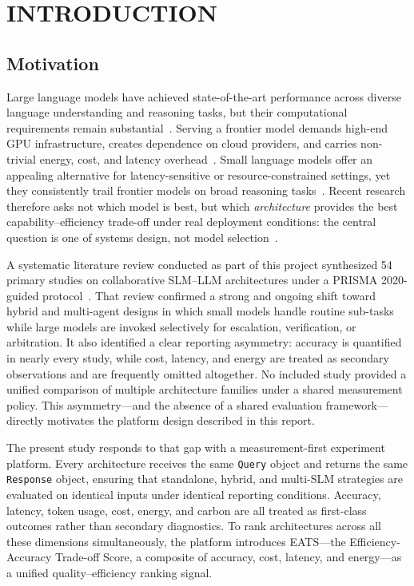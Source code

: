 \chapter{INTRODUCTION}

\section{Motivation}

Large language models have achieved state-of-the-art performance across diverse language understanding and reasoning tasks, but their computational requirements remain substantial~\cite{egi2025,wang2024slmsurvey,chen2025collabmech}. Serving a frontier model demands high-end GPU infrastructure, creates dependence on cloud providers, and carries non-trivial energy, cost, and latency overhead~\cite{energytoken2025,qwqrouting2025,tigani2025cpu}. Small language models offer an appealing alternative for latency-sensitive or resource-constrained settings, yet they consistently trail frontier models on broad reasoning tasks~\cite{egi2025,dorfner2024comparing}. Recent research therefore asks not which model is best, but which \emph{architecture} provides the best capability--efficiency trade-off under real deployment conditions: the central question is one of systems design, not model selection~\cite{hao2024hybrid,shao2025dot,multiagent2025}.

A systematic literature review conducted as part of this project synthesized 54 primary studies on collaborative SLM--LLM architectures under a PRISMA 2020-guided protocol~\cite{slrmanuscript2026}. That review confirmed a strong and ongoing shift toward hybrid and multi-agent designs in which small models handle routine sub-tasks while large models are invoked selectively for escalation, verification, or arbitration. It also identified a clear reporting asymmetry: accuracy is quantified in nearly every study, while cost, latency, and energy are treated as secondary observations and are frequently omitted altogether. No included study provided a unified comparison of multiple architecture families under a shared measurement policy. This asymmetry---and the absence of a shared evaluation framework---directly motivates the platform design described in this report.

The present study responds to that gap with a measurement-first experiment platform. Every architecture receives the same \texttt{Query} object and returns the same \texttt{Response} object, ensuring that standalone, hybrid, and multi-SLM strategies are evaluated on identical inputs under identical reporting conditions. Accuracy, latency, token usage, cost, energy, and carbon are all treated as first-class outcomes rather than secondary diagnostics. To rank architectures across all these dimensions simultaneously, the platform introduces EATS---the Efficiency-Accuracy Trade-off Score, a composite of accuracy, cost, latency, and energy---as a unified quality--efficiency ranking signal.

